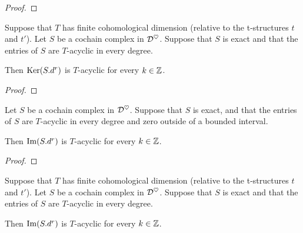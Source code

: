 \begin{proof}
\leanok
\end{proof}


\begin{lemma}
\label{prop-acyclic_ker_of_exact_acyclic_complex_and_bounded_functor}
\leanok 
{}
Suppose that $T$ has finite cohomological dimension (relative to the t-structures $t$ and $t'$).
Let $S$ be a cochain complex in $\mathcal{D}^\heartsuit$.
Suppose that $S$ is exact  and that
the entries of $S$ are $T$-acyclic in every degree.

Then $\operatorname{Ker} (S.d^r)$ is $T$-acyclic for every $k\in\mathbb{Z}$.

\end{lemma}

\begin{proof}
\leanok
\end{proof}


\begin{lemma}
\label{prop-acyclic_image_of_bounded_exact_acyclic_complex}
\leanok 
{}
Let $S$ be a cochain complex in $\mathcal{D}^\heartsuit$.
Suppose that $S$ is exact, and that
the entries of $S$ are $T$-acyclic in every degree and zero outside of a bounded interval.

Then $\operatorname{Im} (S.d^r)$ is $T$-acyclic for every $k\in\mathbb{Z}$.

\end{lemma}

\begin{proof}
\leanok
\end{proof}


\begin{lemma}
\label{prop-acyclic_image_of_exact_acyclic_complex_and_bounded_functor}
\leanok 
{}
Suppose that $T$ has finite cohomological dimension (relative to the t-structures $t$ and $t'$).
Let $S$ be a cochain complex in $\mathcal{D}^\heartsuit$.
Suppose that $S$ is exact  and that
the entries of $S$ are $T$-acyclic in every degree.

Then $\operatorname{Im} (S.d^r)$ is $T$-acyclic for every $k\in\mathbb{Z}$.

\end{lemma}

